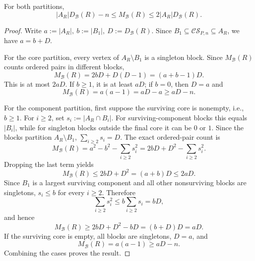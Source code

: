 \documentclass[10pt,a4paper]{amsart}
\begin{document}
\begin{lemma}\label{lem:partition-estimate}
For both partitions,
\[
|A_R|D_{\mathcal{B}}(R)-n
\le M_{\mathcal{B}}(R)
\le 2|A_R|D_{\mathcal{B}}(R).
\]
\end{lemma}

\begin{proof}
Write
\(
a:=|A_R|,\ b:=|B_1|,\ D:=D_{\mathcal B}(R).
\)
Since $B_1\subseteq\mathcal{CS}_{P,n}\subseteq A_R$, we have $a=b+D$.

For the core partition, every vertex of $A_R\setminus B_1$ is a singleton
block. Since $M_{\mathcal B}(R)$ counts ordered pairs in different blocks,
\[
M_{\mathcal B}(R)=2bD+D(D-1)=(a+b-1)D.
\]
This is at most $2aD$. If $b\ge1$, it is at least $aD$; if $b=0$, then
$D=a$ and
\[
M_{\mathcal B}(R)=a(a-1)=aD-a\ge aD-n.
\]

For the component partition, first suppose the surviving core is nonempty, i.e.,
$b\ge1$. For $i\ge2$, set
\(
s_i:=|A_R\cap B_i|.
\)
For surviving-component blocks this equals $|B_i|$, while for singleton blocks
outside the final core it can be $0$ or $1$. Since the blocks partition
$A_R\setminus B_1$,
\(
\sum_{i\ge2}s_i=D.
\)
The exact ordered-pair count is
\[
M_{\mathcal B}(R)
=a^2-b^2-\sum_{i\ge2}s_i^2
=2bD+D^2-\sum_{i\ge2}s_i^2.
\]
Dropping the last term yields
\[
M_{\mathcal B}(R)\le2bD+D^2=(a+b)D\le2aD.
\]
Since $B_1$ is a largest surviving component and all other nonsurviving blocks
are singletons, $s_i\le b$ for every $i\ge2$. Therefore
\[
\sum_{i\ge2}s_i^2\le b\sum_{i\ge2}s_i=bD,
\]
and hence
\[
M_{\mathcal B}(R)\ge2bD+D^2-bD=(b+D)D=aD.
\]
If the surviving core is empty, all blocks are singletons, $D=a$, and
\[
M_{\mathcal B}(R)=a(a-1)\ge aD-n.
\]
Combining the cases proves the result.
\end{proof}
\end{document}
